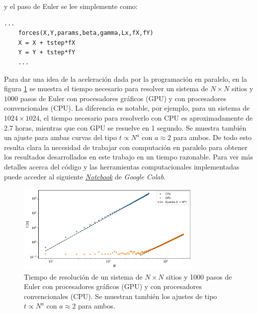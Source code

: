 y el paso de Euler se lee simplemente como:

\begin{lstlisting}[basicstyle=\tiny]
    ...
    forces(X,Y,params,beta,gamma,Lx,fX,fY)
    X = X + tstep*fX
    Y = Y + tstep*fY
    ...
\end{lstlisting}

Para dar una idea de la aceleración dada por la programación en paralelo, en la figura \ref{gpuvscpu} se muestra el tiempo necesario para resolver un sistema 
de $N\times N$ sitios y $1000$ pasos de Euler con procesadores gráficos (GPU) y con procesadores convencionales (CPU). La diferencia es notable, por ejemplo, 
para un sistema de $1024\times1024$,
el tiempo necesario para resolverlo con CPU es aproximadamente de 2.7 horas, mientras que con GPU se resuelve en 1 segundo. Se muestra también un ajuste 
para ambas curvas del tipo $t\propto N^a$ con $a\approx2$ para ambos. De todo esto resulta clara la necesidad de trabajar con computación en paralelo 
para obtener los resultados desarrollados en este trabajo en un tiempo razonable. Para ver más detalles acerca del código y 
las herramientas computacionales implementadas puede acceder al siguiente 
\textit{\href{https://colab.research.google.com/drive/1r0242WjJD_a5SR3ppiUQG25x4ODiM4Ps?usp=sharing}{Notebook}} de \textit{Google Colab}.

\begin{figure}[h]
    \centering
    \includegraphics[width=0.8\textwidth]{t_vs_N.pdf}
    \caption{Tiempo de resolución de un sistema de $N\times N$ sitios y 1000 pasos de Euler con procesadores gráficos (GPU) y con procesadores convencionales (CPU). Se muestran 
    también los ajustes de tipo $t\propto N^a$ con $a\approx2$ para ambos.}
    \label{gpuvscpu}
\end{figure}

